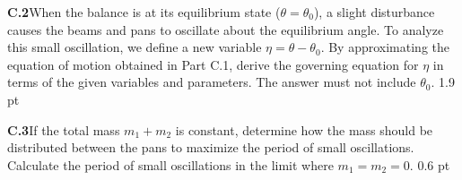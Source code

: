 \textbf{C.2}\quad When the balance is at its equilibrium state
($\theta = \theta_0$), a slight disturbance causes the beams and pans to
oscillate about the equilibrium angle. To analyze this small oscillation, we
define a new variable $\eta = \theta - \theta_0$. By approximating the equation
of motion obtained in Part C.1, derive the governing equation for $\eta$ in
terms of the given variables and parameters. The answer must not include
$\theta_0$. \hfill 1.9 pt

\textbf{C.3}\quad If the total mass $m_1 + m_2$ is constant, determine how the
mass should be distributed between the pans to maximize the period of small
oscillations. Calculate the period of small oscillations in the limit where
$m_1 = m_2 = 0$. \hfill 0.6 pt
